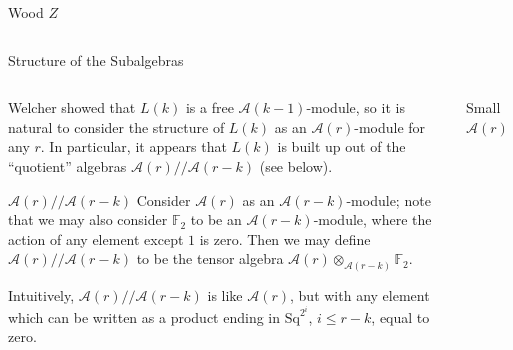 \documentclass[final]{beamer}
\newcommand{\A}{\mathcal{A}}
\newcommand{\F}{\mathbb{F}}
\newcommand{\Sq}{\mathrm{Sq}}
\newcommand{\mm}{/\!/\!}
\begin{document}
\begin{columns}[T]
\begin{column}{0.495\textwidth}
\begin{columns}[T]
\begin{column}{0.497\textwidth}
\begin{block}{Wood $Z$}
          \end{block}
        \end{column}
      \end{columns}
      \begin{section}{Structure of the Subalgebras}
        \begin{columns}[T]
          \begin{column}{0.33\textwidth}
            Welcher showed that $L(k)$ is a free $\A(k-1)$-module, so it is natural to consider the structure of $L(k)$ as an $\A(r)$-module for any $r$.  In particular, it appears that $L(k)$ is built up out of the ``quotient'' algebras $\A(r)\mm\A(r-k)$ (see below).
            \begin{block}{$\A(r)\mm\A(r-k)$}
              Consider $\A(r)$ as an $\A(r-k)$-module; note that we may also consider $\F_2$ to be an $\A(r-k)$-module, where the action of any element except $1$ is zero.  Then we may define \alert{$\A(r)\mm\A(r-k)$} to be the tensor algebra $\A(r)\otimes_{\A(r-k)}\F_2$.
              \begin{bulletitem}
                \alert{Intuitively}, $\A(r)\mm\A(r-k)$ is like $\A(r)$, but with any element which can be written as a product ending in $\Sq^{2^i}$, $i\leq r-k$, equal to zero.
              \end{bulletitem}
            \end{block}
          \end{column}
          \begin{column}{0.66\textwidth}
            \begin{block}{Small $\A(r)$}
              \begin{figure}
                \vspace{-0.8em}
                \begin{center}
                  \hspace{-0.7in}\includegraphics[scale=2]{pics/A0.pdf}\\[1em]

\end{center}
\end{figure}
\end{block}
\end{column}
\end{columns}
\end{section}
\end{column}
\end{columns}
\end{document}
